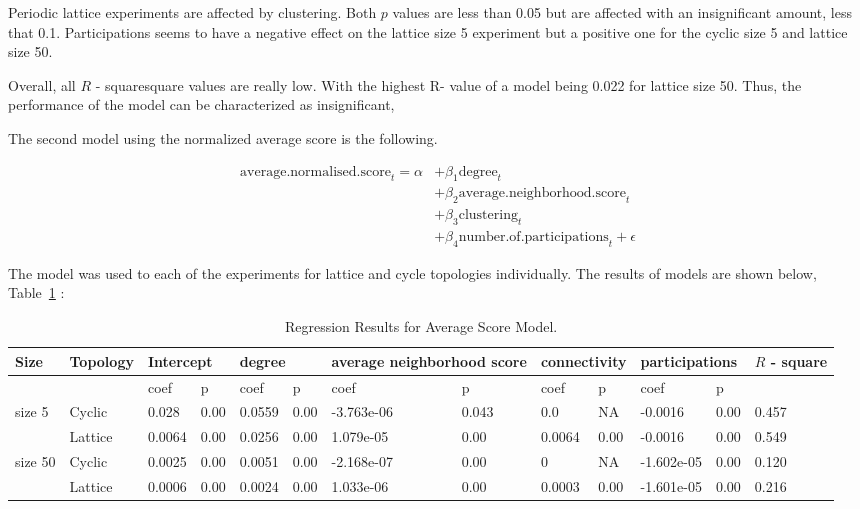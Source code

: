Periodic lattice experiments are affected by clustering. Both \(p\) values
are less than 0.05 but are affected with an insignificant amount, less that 0.1.
Participations seems to have a negative effect on the lattice size 5 experiment
but a positive one for the cyclic size 5 and lattice size 50.

Overall, all \(R\) - squaresquare values  are really low. With the highest R- value of a
model being 0.022 for lattice size 50. Thus, the performance of the model can
be characterized as insignificant,

The second model using the normalized average score is the following.

\begin{align}
	\mathrm{average.normalised.score}_{t} = \alpha
	  & + \beta_{1}  \mathrm{degree}_{t}                              \\
	  & + \beta_{2}  \mathrm{average.neighborhood.score}_{t}          \\
	  & + \beta_{3}  \mathrm{clustering}_{t}                          \\
	  & + \beta_{4}  \mathrm{number.of.participations}_{t} + \epsilon
\end{align}

The model was used to each of the experiments for lattice and cycle topologies
individually. The results of models are shown below, Table~\ref{regression-average} :

\begin{table}[H]
	\centering
	\begin{adjustbox}{width=1\textwidth}
		\small
		\begin{tabular}{@{}|l|l|l|l|l|l|l|l|l|l|l|l|l|@{}}
			\toprule
			Size & Topology & \multicolumn{2}{l|}{Intercept} & \multicolumn{2}{l|}{degree} & \multicolumn{2}{l|}{average neighborhood score} & \multicolumn{2}{l|}{connectivity} & \multicolumn{2}{l|}{participations} & \(R\) - square \\ \midrule
			        &         & coef   & p    & coef   & p    & coef       & p     & coef   & p    & coef       & p    &       \\ \midrule
			size 5  & Cyclic  & 0.028  & 0.00 & 0.0559 & 0.00 & -3.763e-06 & 0.043 & 0.0    & NA   & -0.0016    & 0.00 & 0.457 \\ \midrule
			        & Lattice & 0.0064 & 0.00 & 0.0256 & 0.00 & 1.079e-05  & 0.00  & 0.0064 & 0.00 & -0.0016    & 0.00 & 0.549 \\ \midrule
			size 50 & Cyclic  & 0.0025 & 0.00 & 0.0051 & 0.00 & -2.168e-07 & 0.00  & 0      & NA   & -1.602e-05 & 0.00 & 0.120 \\ \midrule
			        & Lattice & 0.0006 & 0.00 & 0.0024 & 0.00 & 1.033e-06  & 0.00  & 0.0003 & 0.00 & -1.601e-05 & 0.00 & 0.216 \\ \bottomrule
		\end{tabular}
	\end{adjustbox}
	\caption{Regression Results for Average Score Model.}
	\label{regression-average}
\end{table}

